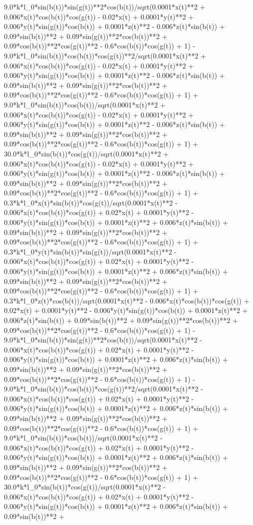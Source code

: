 9.0*k*l_0*sin(b(t))*sin(g(t))**2*cos(b(t))/sqrt(0.0001*x(t)**2 + 0.006*x(t)*cos(b(t))*cos(g(t)) - 0.02*x(t) + 0.0001*y(t)**2 + 0.006*y(t)*sin(g(t))*cos(b(t)) + 0.0001*z(t)**2 - 0.006*z(t)*sin(b(t)) + 0.09*sin(b(t))**2 + 0.09*sin(g(t))**2*cos(b(t))**2 + 0.09*cos(b(t))**2*cos(g(t))**2 - 0.6*cos(b(t))*cos(g(t)) + 1) - 9.0*k*l_0*sin(b(t))*cos(b(t))*cos(g(t))**2/sqrt(0.0001*x(t)**2 + 0.006*x(t)*cos(b(t))*cos(g(t)) - 0.02*x(t) + 0.0001*y(t)**2 + 0.006*y(t)*sin(g(t))*cos(b(t)) + 0.0001*z(t)**2 - 0.006*z(t)*sin(b(t)) + 0.09*sin(b(t))**2 + 0.09*sin(g(t))**2*cos(b(t))**2 + 0.09*cos(b(t))**2*cos(g(t))**2 - 0.6*cos(b(t))*cos(g(t)) + 1) + 9.0*k*l_0*sin(b(t))*cos(b(t))/sqrt(0.0001*x(t)**2 + 0.006*x(t)*cos(b(t))*cos(g(t)) - 0.02*x(t) + 0.0001*y(t)**2 + 0.006*y(t)*sin(g(t))*cos(b(t)) + 0.0001*z(t)**2 - 0.006*z(t)*sin(b(t)) + 0.09*sin(b(t))**2 + 0.09*sin(g(t))**2*cos(b(t))**2 + 0.09*cos(b(t))**2*cos(g(t))**2 - 0.6*cos(b(t))*cos(g(t)) + 1) + 30.0*k*l_0*sin(b(t))*cos(g(t))/sqrt(0.0001*x(t)**2 + 0.006*x(t)*cos(b(t))*cos(g(t)) - 0.02*x(t) + 0.0001*y(t)**2 + 0.006*y(t)*sin(g(t))*cos(b(t)) + 0.0001*z(t)**2 - 0.006*z(t)*sin(b(t)) + 0.09*sin(b(t))**2 + 0.09*sin(g(t))**2*cos(b(t))**2 + 0.09*cos(b(t))**2*cos(g(t))**2 - 0.6*cos(b(t))*cos(g(t)) + 1) + 0.3*k*l_0*x(t)*sin(b(t))*cos(g(t))/sqrt(0.0001*x(t)**2 - 0.006*x(t)*cos(b(t))*cos(g(t)) + 0.02*x(t) + 0.0001*y(t)**2 - 0.006*y(t)*sin(g(t))*cos(b(t)) + 0.0001*z(t)**2 + 0.006*z(t)*sin(b(t)) + 0.09*sin(b(t))**2 + 0.09*sin(g(t))**2*cos(b(t))**2 + 0.09*cos(b(t))**2*cos(g(t))**2 - 0.6*cos(b(t))*cos(g(t)) + 1) + 0.3*k*l_0*y(t)*sin(b(t))*sin(g(t))/sqrt(0.0001*x(t)**2 - 0.006*x(t)*cos(b(t))*cos(g(t)) + 0.02*x(t) + 0.0001*y(t)**2 - 0.006*y(t)*sin(g(t))*cos(b(t)) + 0.0001*z(t)**2 + 0.006*z(t)*sin(b(t)) + 0.09*sin(b(t))**2 + 0.09*sin(g(t))**2*cos(b(t))**2 + 0.09*cos(b(t))**2*cos(g(t))**2 - 0.6*cos(b(t))*cos(g(t)) + 1) + 0.3*k*l_0*z(t)*cos(b(t))/sqrt(0.0001*x(t)**2 - 0.006*x(t)*cos(b(t))*cos(g(t)) + 0.02*x(t) + 0.0001*y(t)**2 - 0.006*y(t)*sin(g(t))*cos(b(t)) + 0.0001*z(t)**2 + 0.006*z(t)*sin(b(t)) + 0.09*sin(b(t))**2 + 0.09*sin(g(t))**2*cos(b(t))**2 + 0.09*cos(b(t))**2*cos(g(t))**2 - 0.6*cos(b(t))*cos(g(t)) + 1) - 9.0*k*l_0*sin(b(t))*sin(g(t))**2*cos(b(t))/sqrt(0.0001*x(t)**2 - 0.006*x(t)*cos(b(t))*cos(g(t)) + 0.02*x(t) + 0.0001*y(t)**2 - 0.006*y(t)*sin(g(t))*cos(b(t)) + 0.0001*z(t)**2 + 0.006*z(t)*sin(b(t)) + 0.09*sin(b(t))**2 + 0.09*sin(g(t))**2*cos(b(t))**2 + 0.09*cos(b(t))**2*cos(g(t))**2 - 0.6*cos(b(t))*cos(g(t)) + 1) - 9.0*k*l_0*sin(b(t))*cos(b(t))*cos(g(t))**2/sqrt(0.0001*x(t)**2 - 0.006*x(t)*cos(b(t))*cos(g(t)) + 0.02*x(t) + 0.0001*y(t)**2 - 0.006*y(t)*sin(g(t))*cos(b(t)) + 0.0001*z(t)**2 + 0.006*z(t)*sin(b(t)) + 0.09*sin(b(t))**2 + 0.09*sin(g(t))**2*cos(b(t))**2 + 0.09*cos(b(t))**2*cos(g(t))**2 - 0.6*cos(b(t))*cos(g(t)) + 1) + 9.0*k*l_0*sin(b(t))*cos(b(t))/sqrt(0.0001*x(t)**2 - 0.006*x(t)*cos(b(t))*cos(g(t)) + 0.02*x(t) + 0.0001*y(t)**2 - 0.006*y(t)*sin(g(t))*cos(b(t)) + 0.0001*z(t)**2 + 0.006*z(t)*sin(b(t)) + 0.09*sin(b(t))**2 + 0.09*sin(g(t))**2*cos(b(t))**2 + 0.09*cos(b(t))**2*cos(g(t))**2 - 0.6*cos(b(t))*cos(g(t)) + 1) + 30.0*k*l_0*sin(b(t))*cos(g(t))/sqrt(0.0001*x(t)**2 - 0.006*x(t)*cos(b(t))*cos(g(t)) + 0.02*x(t) + 0.0001*y(t)**2 - 0.006*y(t)*sin(g(t))*cos(b(t)) + 0.0001*z(t)**2 + 0.006*z(t)*sin(b(t)) + 0.09*sin(b(t))**2 + 